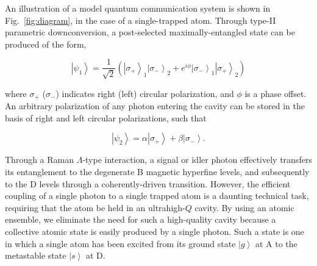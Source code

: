 \documentclass[aps,twocolumn,secnumarabic,amsmath,amssymb,pra,groupedaddress,
showpacs, showkeys,draft]{revtex4-1}
\newcommand{\ket}[1]{\left|#1\right\rangle}
\newcommand{\pna}[1]{\left(#1\right)}
\newcommand{\eqn}[1]{
\begin{equation}
	#1
\end{equation}
}
\begin{document}
An illustration of a model quantum communication system is shown in
Fig.~\ref{fig:diagram}, in the case of a single-trapped atom. Through type-II
parametric downconversion, a post-selected maximally-entangled state can be
produced of the form,
\eqn{
\ket{\psi_1} = \frac{1}{\sqrt{2}}\pna{\ket{\sigma_{+}}_1\ket{\sigma_{-}}_2 + e^{i\phi} \ket{\sigma_{-}}_1 \ket{\sigma_{+}}_2 } \label{eqn:singlet}
}
where $\sigma_{+}$ ($\sigma_{-}$) indicates right (left) circular polarization,
and $\phi$ is a phase offset. An arbitrary polarization of any photon entering
the cavity can be stored in the basis of right and left circular polarizations,
such that
\eqn{
\ket{\psi_2} = \alpha \ket{\sigma_{+}}+\beta \ket{\sigma_{-}}.
}
Through a Raman $\Lambda$-type interaction, a signal or idler photon
effectively transfers its entanglement to the degenerate B magnetic hyperfine
levels, and subsequently to the D levels through a coherently-driven
transition. However, the efficient coupling of a single photon to a single
trapped atom is a daunting technical task, requiring that the atom be held in
an ultrahigh-$Q$ cavity. By using an atomic ensemble, we eliminate the need for
such a high-quality cavity because a collective atomic state is easily produced
by a single photon. Such a state is one in which a single atom has been excited
from its ground state $\ket{g}$ at A to the metastable state $\ket{s}$ at D. 
\end{document}
